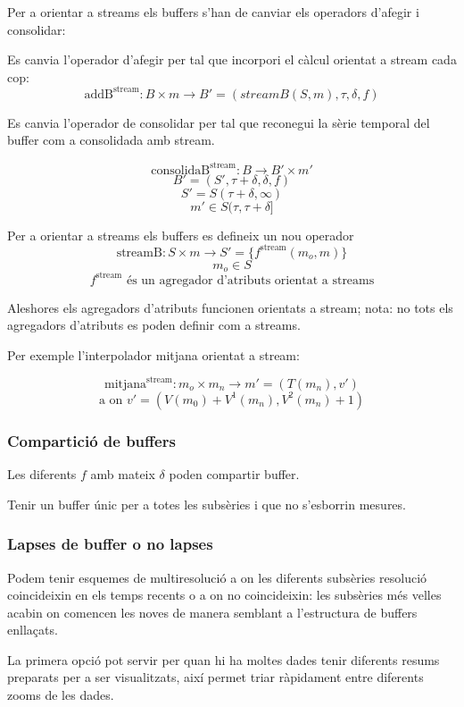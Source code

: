 Per a orientar a streams els buffers s'han de canviar els operadors
d'afegir i consolidar:

Es canvia l'operador d'afegir per tal que incorpori el càlcul orientat
a stream cada cop:
\[
\text{addB}^{\text{stream}}: B \times m \longrightarrow B' =
(streamB(S,m),\tau,\delta,f)
\]

Es canvia l'operador de consolidar per tal que reconegui la sèrie
temporal del buffer com a consolidada amb stream.

  \[
  \text{consolidaB}^{\text{stream}}: B \longrightarrow B' \times m'
  \]
  \[
  B'= (S',\tau+\delta,\delta,f)
  \]
  \[
  S' = S(\tau+\delta,\infty)
  \]
  \[
  m' \in S(\tau,\tau+\delta] 
  \]


Per a orientar a streams els buffers es defineix un nou operador
\[
\text{streamB}: S \times m \longrightarrow S' = \{f^{\text{stream}}(m_o,m)\}
\]
\[
m_o \in S
\]
\[
f^{\text{stream}} \text{ és un agregador d'atributs orientat a streams}
\]
 

Aleshores els agregadors d'atributs funcionen orientats a stream;
nota: no tots els agregadors d'atributs es poden definir com a
streams.


Per exemple l'interpolador mitjana orientat a stream:

\[
\text{mitjana}^{\text{stream}}: m_o \times m_n \longrightarrow m' = (T(m_n),v')
\]
\[
\text{a on } v' = (V(m_0) + V^1(m_n), V^2(m_n) + 1 )
\]






\subsubsection{Compartició de buffers}


Les diferents $f$ amb mateix $\delta$ poden compartir buffer.


Tenir un buffer únic per a totes les subsèries i que no s'esborrin mesures.

\subsubsection{Lapses de buffer o no lapses}

Podem tenir esquemes de multiresolució a on les diferents subsèries
resolució coincideixin en els temps recents o a on no coincideixin:
les subsèries més velles acabin on comencen les noves de manera
semblant a l'estructura de buffers enllaçats.

La primera opció pot servir per quan hi ha moltes dades tenir diferents resums preparats per a ser visualitzats, així permet triar ràpidament entre diferents zooms de les dades.

